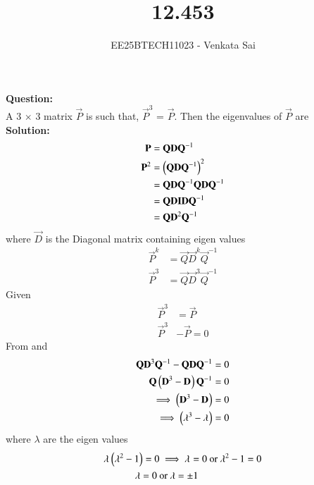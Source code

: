 \documentclass[journal]{IEEEtran}
\begin{document}


\title{12.453}
\author{EE25BTECH11023 - Venkata Sai}
\maketitle 
\renewcommand{\thefigure}{\theenumi}
\renewcommand{\thetable}{\theenumi}
\setlength{\intextsep}{10pt} %

\renewcommand{\thetable}{\theenumi}
\vspace{-1em}
\textbf{Question:}  \\
A 3 $\times$ 3 matrix $\vec{P}$ is such that, $\vec{P}^3$ = $\vec{P}$. Then the eigenvalues of $\vec{P}$ are\\
\textbf{Solution:}  \\
  \begin{align}
     \mathbf{P}&=\mathbf{Q}\mathbf{D}\mathbf{Q}^{-1} \\
      \mathbf{P}^2&=\left(\mathbf{Q}\mathbf{D}\mathbf{Q}^{-1}\right)^2 \\
      &=\mathbf{Q}\mathbf{D}\mathbf{Q}^{-1}\mathbf{Q}\mathbf{D}\mathbf{Q}^{-1}\\
      &=\mathbf{Q}\mathbf{D}\mathbf{I}\mathbf{D}\mathbf{Q}^{-1}\\
      &=\mathbf{Q}\mathbf{D}^2\mathbf{Q}^{-1}
 \end{align}
 where $\vec{D}$ is the Diagonal matrix containing eigen values
 \begin{align}
     \vec{P}^k&=\vec{Q}\vec{D}^k\vec{Q}^{-1} \\
     \vec{P}^3&=\vec{Q}\vec{D}^3\vec{Q}^{-1} 
     \end{align}
Given 
\begin{align}
    \vec{P}^3 &= \vec{P} \\
      \vec{P}^{3}& - \vec{P} = 0
      \end{align}
From  and 
      \begin{align}
   \mathbf{Q}\mathbf{D}^{3}\mathbf{Q}^{-1}-\mathbf{Q}\mathbf{D}\mathbf{Q}^{-1}=0 \\
   \mathbf{Q}\left(\mathbf{D}^{3}-\mathbf{D}^{}\right)\mathbf{Q}^{-1}=0 \\
   \implies \left(\mathbf{D}^{3}-\mathbf{D}^{}\right)=0\\
   \implies \left(\mathbf{\lambda}^{3}-\mathbf{\lambda}^{}\right)=0 
\end{align}
where $\lambda$ are the eigen values
\begin{align}
    \lambda^{}\left(\lambda^2-1\right)=0&\implies
    \lambda^{}=0\ \text{or}\ \lambda^{2}-1=0 \\
     \lambda=0\ &\text{or}\ \lambda=\pm1
\end{align}
 
\end{document}
